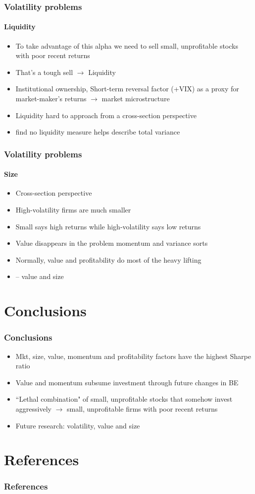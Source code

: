 \documentclass[notes]{beamer}  %
\begin{document}
\begin{frame} \frametitle{Volatility problems} \framesubtitle{Liquidity}
  \begin{itemize}
    \item To take advantage of this alpha we need to sell small,
    unprofitable stocks with poor recent returns
    \item That's a tough sell $\rightarrow$ Liquidity
    \parencite{nagel2005short, nagel2012evaporating}
    \item Institutional ownership, Short-term reversal factor (+VIX) as a proxy
    for market-maker's returns $\rightarrow$ market microstructure
    \item Liquidity hard to approach from a cross-section perspective
    \item \textcite{ang2006cross} find no liquidity measure helps describe
    total variance
  \end{itemize}
\end{frame}

\begin{frame} \frametitle{Volatility problems} \framesubtitle{Size}
  \begin{itemize}
    \item Cross-section perspective
    \item High-volatility firms are much smaller
    \item Small says high returns while high-volatility says low returns
    \item Value disappears in the problem momentum and variance sorts
    \item Normally, value and profitability do most of the heavy lifting
    \item \textcite{gerakos2017decomposing} -- value and size
  \end{itemize}
\end{frame}

\section{Conclusions}

\begin{frame} \frametitle{Conclusions}
  \begin{itemize}
    \item Mkt, size, value, momentum and profitability factors have the
    highest Sharpe ratio
    \item Value and momentum subsume investment through future changes in BE
    \item ``Lethal combination" of small, unprofitable stocks that somehow
    invest aggressively $\rightarrow$ small, unprofitable firms with poor
    recent returns
    \item Future research: volatility, value and size
  \end{itemize}
\end{frame}

\section{References}

\begin{frame}[allowframebreaks]
  \frametitle{References}
  \printbibliography
\end{frame}
\end{document}
